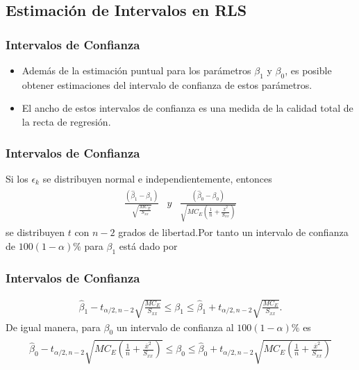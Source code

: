 \documentclass{beamer}
\begin{document}
\subsection{Estimaci\'on de Intervalos en RLS}
\begin{frame}\frametitle{Intervalos de Confianza}
\begin{itemize}
\item Adem\'as de la estimaci\'on puntual para los par\'ametros $\beta_{1}$ y $\beta_{0}$, es posible obtener estimaciones del intervalo de confianza de estos par\'ametros.\pause

\item El ancho de estos intervalos de confianza es una medida de la calidad total de la recta de regresi\'on.

\end{itemize}


\end{frame}

\begin{frame}\frametitle{Intervalos de Confianza}
Si los $\epsilon_{k}$ se distribuyen normal e independientemente, entonces
\begin{eqnarray*}
\begin{array}{ccc}
\frac{\left(\hat{\beta}_{1}-\beta_{1}\right)}{\sqrt{\frac{MC_{E}}{S_{xx}}}}&y &\frac{\left(\hat{\beta}_{0}-\beta_{0}\right)}{\sqrt{MC_{E}\left(\frac{1}{n}+\frac{\overline{x}^{2}}{S_{xx}}\right)}}
\end{array}
\end{eqnarray*}
se distribuyen $t$ con $n-2$ grados de libertad.\pause Por tanto un intervalo de confianza de $100\left(1-\alpha\right)\%$ para $\beta_{1}$ est\'a dado por
\end{frame}
\begin{frame}\frametitle{Intervalos de Confianza}
\begin{eqnarray}
\hat{\beta}_{1}-t_{\alpha/2,n-2}\sqrt{\frac{MC_{E}}{S_{xx}}}\leq \beta_{1}\leq\hat{\beta}_{1}+t_{\alpha/2,n-2}\sqrt{\frac{MC_{E}}{S_{xx}}}.
\end{eqnarray}\pause
De igual manera, para $\beta_{0}$ un intervalo de confianza al $100\left(1-\alpha\right)\%$ es
\small{
\begin{eqnarray}
\begin{array}{l}
\hat{\beta}_{0}-t_{\alpha/2,n-2}\sqrt{MC_{E}\left(\frac{1}{n}+\frac{\overline{x}^{2}}{S_{xx}}\right)}\leq\beta_{0}\leq\hat{\beta}_{0}+t_{\alpha/2,n-2}\sqrt{MC_{E}\left(\frac{1}{n}+\frac{\overline{x}^{2}}{S_{xx}}\right)}
\end{array}
\end{eqnarray}}
\end{frame}
\end{document}
